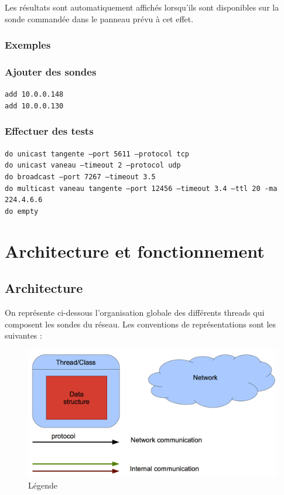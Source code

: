 \documentclass[a4paper,11pt]{article}
\begin{document}
Les résultats sont automatiquement affichés lorsqu'ils sont disponibles sur la sonde commandée dans le panneau prévu à cet effet.


\subsubsection{Exemples}
\subsubsection*{Ajouter des sondes}
\texttt{add 10.0.0.148}\\
\indent\texttt{add 10.0.0.130}

\subsubsection*{Effectuer des tests}
\texttt{do unicast tangente --port 5611 --protocol tcp}\\
\indent\texttt{do unicast vaneau --timeout 2 --protocol udp}\\
\indent\texttt{do broadcast --port 7267 --timeout 3.5 }\\
\indent\texttt{do multicast vaneau tangente --port 12456 --timeout 3.4 --ttl 20 -ma 224.4.6.6}\\
\indent\texttt{do empty}

\section{Architecture et fonctionnement}


\subsection{Architecture}

On représente ci-dessous l'organisation globale des différents threads qui composent les sondes du réseau.
Les conventions de représentations sont les suivantes :
\begin{figure}[!ht]
\centering\includegraphics[width=\linewidth]{img/graphLegend.png}
\caption{Légende}
\end{figure}
\end{document}
